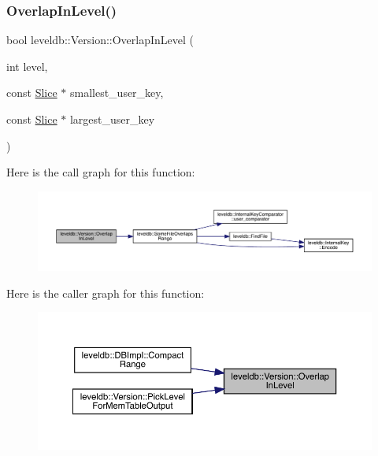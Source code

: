 \subsubsection{\texorpdfstring{OverlapInLevel()}{OverlapInLevel()}}
{\footnotesize\ttfamily bool leveldb\+::\+Version\+::\+Overlap\+In\+Level (\begin{DoxyParamCaption}\item[{int}]{level,  }\item[{const \mbox{\hyperlink{classleveldb_1_1_slice}{Slice}} $\ast$}]{smallest\+\_\+user\+\_\+key,  }\item[{const \mbox{\hyperlink{classleveldb_1_1_slice}{Slice}} $\ast$}]{largest\+\_\+user\+\_\+key }\end{DoxyParamCaption})}

Here is the call graph for this function\+:
\nopagebreak
\begin{figure}[H]
\begin{center}
\leavevmode
\includegraphics[width=350pt]{classleveldb_1_1_version_a7945e88b8a4f2f7b6f3201cb3d791f1e_cgraph}
\end{center}
\end{figure}
Here is the caller graph for this function\+:
\nopagebreak
\begin{figure}[H]
\begin{center}
\leavevmode
\includegraphics[width=350pt]{classleveldb_1_1_version_a7945e88b8a4f2f7b6f3201cb3d791f1e_icgraph}
\end{center}
\end{figure}
\mbox{\label{classleveldb_1_1_version_ac3b623319110ed2a9491723dd4675431}} 
